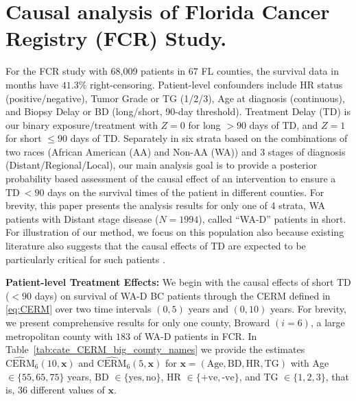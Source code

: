 \documentclass[aoas]{imsart}
\theoremstyle{plain}
\theoremstyle{definition}
\begin{document}
\section{Causal analysis of Florida Cancer Registry (FCR) Study.}
For the  FCR study with 68,009 patients in 67 FL  counties, the survival data in months have $41.3\%$ right-censoring. Patient-level confounders include HR status (positive/negative), Tumor Grade or TG (1/2/3), Age at diagnosis (continuous), and Biopsy Delay or BD (long/short, 90-day threshold).
Treatment Delay (TD) is our binary exposure/treatment with $Z=0$ for long $>90$ days of TD, and $Z=1$ for short $\le 90$  days of TD. 
Separately in six strata based on the combinations of two races (African American (AA) and Non-AA (WA)) and 3 stages of diagnosis (Distant/Regional/Local), our main analysis goal is to provide a posterior probability based assessment of the causal effect of an intervention to ensure a $\text{TD}\ <90$ days on the survival 
times of the patient in different counties. 
For brevity, this paper presents the analysis results for only one of 4 strata, WA patients with Distant stage disease ($N=1994$), called ``WA-D'' patients in short. For illustration of our method, we focus on this population also because existing literature also suggests that the causal effects of TD are expected to be particularly critical for such patients \parencite{Gwyn2004racialdifference,Bleicher2016breastcancersurvival, Richards1999delay}. 

\textbf{Patient-level Treatment Effects:}
We begin with the causal effects of short TD ($<90$ days) on survival of WA-D BC patients through the CERM defined in \eqref{eq:CERM} over two time intervals $(0,5)$ years and $(0,10)$ years. For brevity, we present comprehensive results for only one county, Broward  $(i = 6)$, a large metropolitan county with  $183$ of WA-D patients in FCR. In Table~\ref{tab:cate_CERM_big_county_names} we provide the estimates $\widehat{\text{CERM}}_6(10, \mathbf{x})$ and $\widehat{\text{CERM}}_6(5, \mathbf{x})$ for $\mathbf{x} = (\text{Age}, \text{BD}, \text{HR}, \text{TG})$ with Age $\in \{55, 65, 75\}$ years, BD $\in \{\text{yes}, \text{no}\}$, HR $\in \{\text{+ve}, \text{-ve}\}$, and TG $\in \{1, 2, 3\}$, that is, 36 different values of $\mathbf{x}$.
\end{document}
